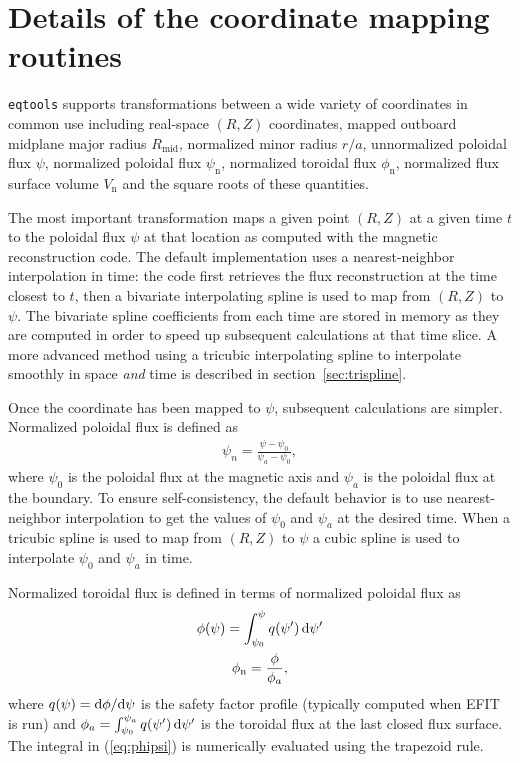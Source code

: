 \documentclass{elsarticle}
\newcommand{\diff}{\ensuremath\mathrm{d}}
\newcommand{\eqtools}{\texttt{eqtools}\xspace}
\begin{document}
\section{Details of the coordinate mapping routines}\label{sec:algo}
\eqtools supports transformations between a wide variety of coordinates in common use including real-space $(R, Z)$ coordinates, mapped outboard midplane major radius $R_{\text{mid}}$, normalized minor radius $r/a$, unnormalized poloidal flux $\psi$, normalized poloidal flux $\psi_{\text{n}}$, normalized toroidal flux $\phi_{\text{n}}$, normalized flux surface volume $V_{\text{n}}$ and the square roots of these quantities.

The most important transformation maps a given point $(R, Z)$ at a given time $t$ to the poloidal flux $\psi$ at that location as computed with the magnetic reconstruction code.
The default implementation uses a nearest-neighbor interpolation in time: the code first retrieves the flux reconstruction at the time closest to $t$, then a bivariate interpolating spline \cite{dierckxBook,scipy} is used to map from $(R, Z)$ to $\psi$.
The bivariate spline coefficients from each time are stored in memory as they are computed in order to speed up subsequent calculations at that time slice.
A more advanced method using a tricubic interpolating spline to interpolate smoothly in space \emph{and} time is described in section~\ref{sec:trispline}.

Once the coordinate has been mapped to $\psi$, subsequent calculations are simpler.
Normalized poloidal flux is defined as
\begin{gather}
	\psi_{n} = \frac{\psi - \psi_{0}}{\psi_{a} - \psi_{0}},
\end{gather}
where $\psi_{0}$ is the poloidal flux at the magnetic axis and $\psi_{a}$ is the poloidal flux at the boundary.
To ensure self-consistency, the default behavior is to use nearest-neighbor interpolation to get the values of $\psi_{0}$ and $\psi_{a}$ at the desired time.
When a tricubic spline is used to map from $(R, Z)$ to $\psi$ a cubic spline is used to interpolate $\psi_{0}$ and $\psi_{a}$ in time.

Normalized toroidal flux is defined in terms of normalized poloidal flux as
\begin{equation}
	\begin{gathered}
		\phi(\psi) = \int_{\psi_{0}}^{\psi} q(\psi')\,\diff\psi'\label{eq:phipsi}\\
		\phi_{\text{n}} = \frac{\phi}{\phi_{a}},
	\end{gathered}
\end{equation}
where $q(\psi) = \diff\phi/\diff\psi$ is the safety factor profile (typically computed when EFIT is run) and $\phi_{a}=\int_{\psi_{0}}^{\psi_{a}}q(\psi')\,\diff\psi'$ is the toroidal flux at the last closed flux surface.
The integral in (\ref{eq:phipsi}) is numerically evaluated using the trapezoid rule.
\end{document}

